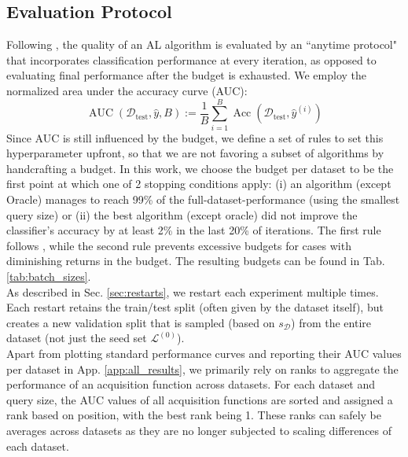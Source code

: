 \documentclass[]{article}
\newcommand{\D}{\mathcal{D}}
\newcommand{\LL}{\mathcal{L}}
\newcommand{\test}{\text{test}}
\begin{document}
\subsection{Evaluation Protocol}\label{sec:evaluation}
Following \cite{zhou2021towards}, the quality of an AL algorithm is evaluated by an ``anytime protocol" that incorporates classification performance at every iteration, as opposed to evaluating final performance after the budget is exhausted.
We employ the normalized area under the accuracy curve (AUC):
\begin{equation}\label{eq:auc}
	\operatorname{AUC}(\D_\test, \hat y, B) := \frac{1}{B} \sum_{i=1}^{B} \operatorname{Acc}(\D_\test, \hat y^{(i)})
\end{equation}
Since AUC is still influenced by the budget, we define a set of rules to set this hyperparameter upfront, so that we are not favoring a subset of algorithms by handcrafting a budget.
In this work, we choose the budget per dataset to be the first point at which one of 2 stopping conditions apply: (i) an algorithm (except Oracle) manages to reach 99\% of the full-dataset-performance (using the smallest query size) or (ii) the best algorithm (except oracle) did not improve the classifier's accuracy by at least 2\% in the last 20\% of iterations.
The first rule follows \cite{ji2023randomness}, while the second rule prevents excessive budgets for cases with diminishing returns in the budget.
The resulting budgets can be found in Tab. \ref{tab:batch_sizes}. \\ [1mm]
As described in Sec. \ref{sec:restarts}, we restart each experiment multiple times.
Each restart retains the train/test split (often given by the dataset itself), but creates a new validation split that is sampled (based on $s_\D$) from the entire dataset (not just the seed set $\LL^{(0)}$). \\ [1mm]
%
Apart from plotting standard performance curves and reporting their AUC values per dataset in App. \ref{app:all_results}, we primarily rely on ranks to aggregate the performance of an acquisition function across datasets.
For each dataset and query size, the AUC values of all acquisition functions are sorted and assigned a rank based on position, with the best rank being 1.
These ranks can safely be averages across datasets as they are no longer subjected to scaling differences of each dataset.
\end{document}
